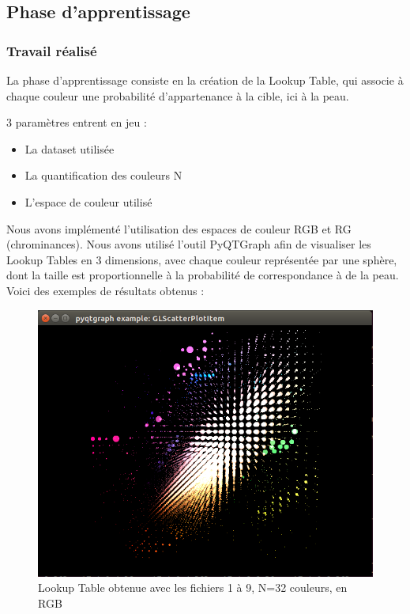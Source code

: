 \documentclass[a4paper,11pt]{article}
\begin{document}
\subsection{Phase d'apprentissage}

\subsubsection{Travail réalisé}

La phase d'apprentissage consiste en la création de la Lookup Table, qui associe à chaque couleur une probabilité d'appartenance à la cible, ici à la peau.

3 paramètres entrent en jeu :

\begin{itemize}
    \item La dataset utilisée
    \item La quantification des couleurs N
    \item L'espace de couleur utilisé\\
\end{itemize}

Nous avons implémenté l'utilisation des espaces de couleur RGB et RG (chrominances). Nous avons utilisé l'outil PyQTGraph afin de visualiser les Lookup Tables en 3 dimensions, avec chaque couleur représentée par une sphère, dont la taille est proportionnelle à la probabilité de correspondance à de la peau.\\

Voici des exemples de résultats obtenus :

\begin{figure}[H]
\begin{center}
    \includegraphics[scale=0.5]{lT_1_9_8_RGB.png}
    \caption{Lookup Table obtenue avec les fichiers 1 à 9, N=32 couleurs, en RGB}
\end{center}
\end{figure}
\end{document}
